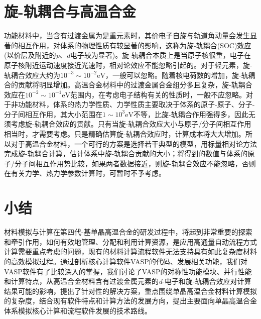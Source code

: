 \section{旋-轨耦合与高温合金}
功能材料中，当含有过渡金属为是重元素时，其价电子自旋与轨道角动量会发生显著的相互作用，对体系的物理性质有较显著的影响，这称为旋-轨耦合\textrm{(SOC)}效应(以价层及附近的\textit{p}、\textit{d}电子较为显著)。旋-轨耦合本质上是当原子核很重，电子在原子核附近运动速度接近光速时，相对论效应不能忽略引起的。对于轻元素，旋-轨耦合效应大约为$10^{-3}\sim10^{-2}\mathrm{eV}$，一般可以忽略。随着核电荷数的增加，旋-轨耦合的贡献将明显增加。高温合金材料中的过渡金属合金组分多且复杂，旋-轨耦合效应在$10^{-2}\sim10^{-1}\mathrm{eV}$范围内，在考虑电子结构有关的性质时，一般不应忽略。对于非功能材料，体系的热力学性质、力学性质主要取决于体系的原子-原子、分子-分子间相互作用，其大小范围在$1\sim10^3\mathrm{eV}$不等，比旋-轨耦合作用强得多，因此无须考虑旋-轨耦合效应的贡献。只有当旋-轨耦合效应大小与原子/分子间相互作用相当时，才需要考虑。只是精确估算旋-轨耦合效应时，计算成本将大大增加。所以对于高温合金材料，一个可行的方案是选择若干典型的模型，用标量相对论方法完成旋-轨耦合计算，估计体系中旋-轨耦合贡献的大小；将得到的数值与体系的原子/分子间相互作用势比较，如果两者数据接近，则旋-轨耦合效应不能忽略，否则在有关力学、热力学参数计算时，可暂时不予考虑。

\section{小结}
材料模拟与计算在第四代-基单晶高温合金的研发过程中，将起到非常重要的探索和牵引作用，如何有效地管理、分配和利用计算资源，是应用高通量自动流程方式计算需要重点考虑的问题，现有的材料计算流程软件无法支持具有如此复杂度材料的高效模拟过程。通过剖析核心计算软件\textrm{VASP}的代码、发展相关功能，我们对\textrm{VASP}软件有了比较深入的掌握，我们讨论了\textrm{VASP}的对称性功能模块、并行性能和计算特点，从高温合金材料含有过渡金属元素的\textit{d}-电子和旋-轨耦合效应对计算结果可能的影响，提出了针对性的解决方案，重点围绕单晶高温合金材料计算模拟的复杂度，结合现有软件特点和计算方法的发展方向，提出主要面向单晶高温合金体系模拟核心计算和流程软件发展的技术路线。
